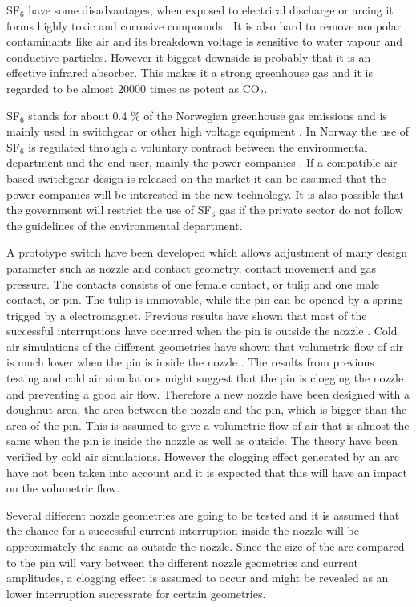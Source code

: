 \documentclass[10pt,a4paper]{article}
\begin{document}
SF$_6$ have some disadvantages, when exposed to electrical discharge or arcing it forms highly toxic and corrosive compounds \cite{bib:SF6PI}. It is also hard to remove nonpolar contaminants like air and its breakdown voltage is sensitive to water vapour and conductive particles. However it biggest downside is probably that it is an effective infrared absorber. This makes it a strong greenhouse gas \cite{bib:SF6PI} and it is regarded to be almost $20000$ times as potent as CO$_2$.

SF$_6$ stands for about 0.4 \% of the Norwegian greenhouse gas emissions and is mainly used in switchgear or other high voltage equipment \cite{bib:KlimaKur2020}. In Norway the use of SF$_6$ is regulated through a voluntary contract between the environmental department and the end user, mainly the power companies \cite{bib:KlimaKur2020}. If a compatible air based switchgear design is released on the market it can be assumed that the power companies will be interested in the new technology. It is also possible that the government will restrict the use of SF$_6$ gas if the private sector do not follow the guidelines of the environmental department.

A prototype switch have been developed which allows adjustment of many design parameter such as nozzle and contact geometry, contact movement and gas pressure. The contacts consists of one female contact, or tulip and one male contact, or pin. The tulip is immovable, while the pin can be opened by a spring trigged by a electromagnet. Previous results have shown that most of the successful interruptions have occurred when the pin is outside the nozzle \cite{bib:CIAMVLBS}. Cold air simulations of the different geometries have shown that volumetric flow of air is much lower when the pin is inside the nozzle \cite{NOE}. The results from previous testing and cold air simulations might suggest that the pin is clogging the nozzle and preventing a good air flow. Therefore a new nozzle have been designed with a doughnut area, the area between the nozzle and the pin, which is bigger than the area of the pin. This is assumed to give a volumetric flow of air that is almost the same when the pin is inside the nozzle as well as outside. The theory have been verified by cold air simulations. However the clogging effect generated by an arc have not been taken into account and it is expected that this will have an impact on the volumetric flow.

Several different nozzle geometries are going to be tested and it is assumed that the chance for a successful current interruption inside the nozzle will be approximately the same as outside the nozzle. Since the size of the arc compared to the pin will vary between the different nozzle geometries and current amplitudes, a clogging effect is assumed to occur and might be revealed as an lower interruption successrate for certain geometries. 
\newpage
\end{document}
